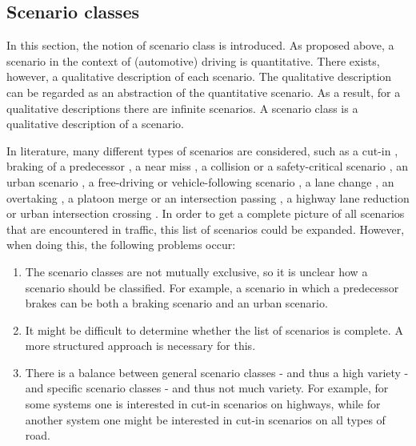 \subsection{Scenario classes}
In this section, the notion of scenario class is introduced. As proposed above, a scenario in the context of (automotive) driving is quantitative. There exists, however, a qualitative description of each scenario. The qualitative description can be regarded as an abstraction of the quantitative scenario. As a result, for a qualitative descriptions there are infinite scenarios. A scenario class is a qualitative description of a scenario. 

In literature, many different types of scenarios are considered, such as a cut-in \cite{xu2002effects, gietelink2006development,roesener2017comprehensive}, braking of a predecessor \cite{xu2002effects,deGelder2017assessment,hulshof2013autonomous}, a near miss \cite{gietelink2006development}, a collision or a safety-critical scenario \cite{gietelink2006development,ebner2011identifying}, an urban scenario \cite{zofka2015datadrivetrafficscenarios}, a free-driving or vehicle-following scenario \cite{roesener2017comprehensive}, a lane change \cite{roesener2017comprehensive}, an overtaking \cite{karaduman2013interactivebehavior}, a platoon merge or an intersection passing \cite{englund2016grand}, a highway lane reduction or urban intersection crossing \cite{ploeg2017GCDC}. In order to get a complete picture of all scenarios that are encountered in traffic, this list of scenarios could be expanded. However, when doing this, the following problems occur:

\begin{enumerate}
	\item The scenario classes are not mutually exclusive, so it is unclear how a scenario should be classified. For example, a scenario in which a predecessor brakes can be both a braking scenario and an urban scenario. \label{item:mutual exclusiveness}
	\item It might be difficult to determine whether the list of scenarios is complete. A more structured approach is necessary for this. \label{item:completeness}
	\item There is a balance between general scenario classes - and thus a high variety - and specific scenario classes - and thus not much variety. For example, for some systems one is interested in cut-in scenarios on highways, while for another system one might be interested in cut-in scenarios on all types of road. \label{item:generality}
\end{enumerate}

